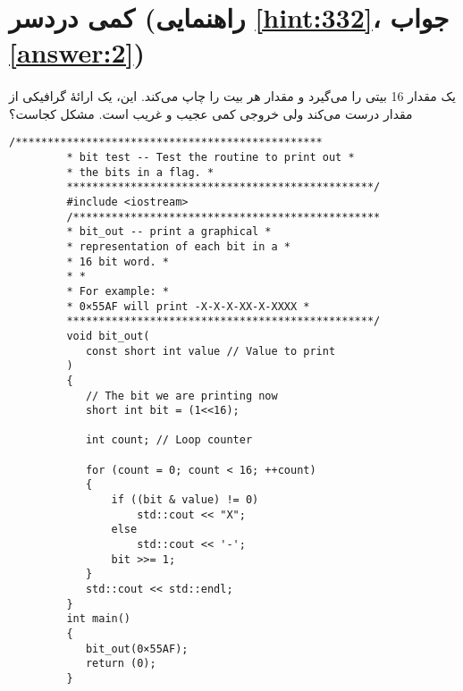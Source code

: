 \section[کمی دردسر]{کمی دردسر \protect{} (راهنمایی \ref{hint:332}، جواب \ref{answer:2})}
\paragraph{}\label{prog:41}
 یک مقدار 16 بیتی را می‌گیرد و مقدار هر بیت را چاپ می‌کند. این، یک ارائهٔ گرافیکی از مقدار درست می‌کند ولی خروجی کمی عجیب و غریب است. مشکل کجاست؟

\begin{LTR}
    \begin{lstlisting}[style=C++Style]
         /************************************************
         * bit test -- Test the routine to print out *
         * the bits in a flag. *
         ************************************************/
         #include <iostream>
         /************************************************
         * bit_out -- print a graphical *
         * representation of each bit in a *
         * 16 bit word. *
         * *
         * For example: *
         * 0×55AF will print -X-X-X-XX-X-XXXX *
         ************************************************/
         void bit_out(
         	const short int value // Value to print
         )
         {
         	// The bit we are printing now
         	short int bit = (1<<16);

         	int count; // Loop counter

         	for (count = 0; count < 16; ++count)
         	{
         		if ((bit & value) != 0)
         			std::cout << "X";
         		else
         			std::cout << '-';
         		bit >>= 1;
         	}
         	std::cout << std::endl;
         }
         int main()
         {
         	bit_out(0×55AF);
         	return (0);
         }
    \end{lstlisting}
\end{LTR}